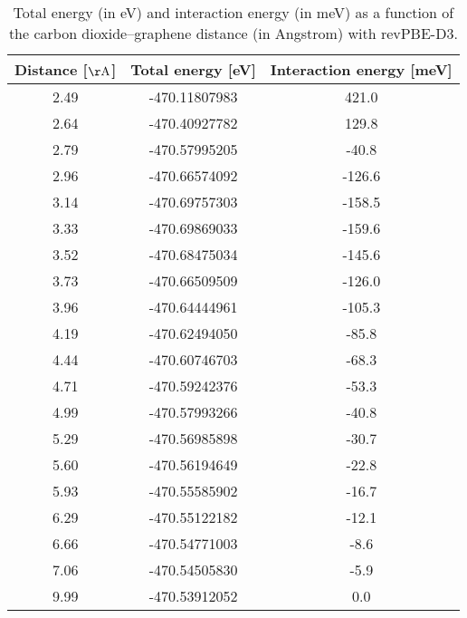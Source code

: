 \begin{table}[h]
\centering
\begin{tabular}{ccc}
\hline
Distance [$\mathrm{\AA}$] & Total energy [eV] & Interaction energy [meV] \\
\hline
2.49 & -470.11807983 & 421.0 \\
2.64 & -470.40927782 & 129.8 \\
2.79 & -470.57995205 & -40.8 \\
2.96 & -470.66574092 & -126.6 \\
3.14 & -470.69757303 & -158.5 \\
3.33 & -470.69869033 & -159.6 \\
3.52 & -470.68475034 & -145.6 \\
3.73 & -470.66509509 & -126.0 \\
3.96 & -470.64444961 & -105.3 \\
4.19 & -470.62494050 & -85.8 \\
4.44 & -470.60746703 & -68.3 \\
4.71 & -470.59242376 & -53.3 \\
4.99 & -470.57993266 & -40.8 \\
5.29 & -470.56985898 & -30.7 \\
5.60 & -470.56194649 & -22.8 \\
5.93 & -470.55585902 & -16.7 \\
6.29 & -470.55122182 & -12.1 \\
6.66 & -470.54771003 & -8.6 \\
7.06 & -470.54505830 & -5.9 \\
9.99 & -470.53912052 & 0.0 \\
\hline
\end{tabular}
\caption{Total energy (in eV) and interaction energy (in meV) as a function of the carbon dioxide--graphene distance (in Angstrom) with revPBE-D3.}
\label{SI_dft_table_revPBE-D3}
\end{table}